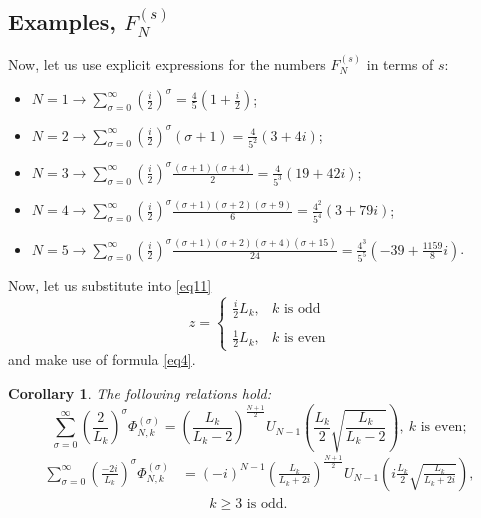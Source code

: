 \documentclass{article}
\newtheorem{cor}[thm]{Corollary}
\begin{document}
\subsection{Examples, $F_N^{(s)}$}

Now, let us use explicit expressions for the numbers $F_N^{(s)}$ in terms of $s$:
\begin{itemize}
\item $N = 1 \rightarrow\sum_{\sigma = 0}^{\infty} \left(\frac{i}{2}\right)^\sigma = \frac{4}{5}\left(1 + \frac{i}{2}\right)$;
\item $N = 2 \rightarrow \sum_{\sigma = 0}^{\infty} \left(\frac{i}{2}\right)^{\sigma}(\sigma + 1) = \frac{4}{5^2}(3 + 4i)$;
\item $N = 3 \rightarrow \sum_{\sigma = 0}^{\infty} \left(\frac{i}{2}\right)^\sigma \frac{(\sigma + 1)(\sigma + 4)}{2} = \frac{4}{5^3}(19 + 42i)$;
\item $N = 4 \rightarrow \sum_{\sigma = 0}^{\infty} \left(\frac{i}{2}\right)^\sigma \frac{(\sigma + 1)(\sigma + 2)(\sigma + 9)}{6} = \frac{4^2}{5^4}(3 + 79i)$;
\item $N = 5 \rightarrow \sum_{\sigma = 0}^{\infty} \left(\frac{i}{2}\right)^\sigma \frac{(\sigma + 1)(\sigma + 2)(\sigma + 4)(\sigma + 15)}{24} = \frac{4^3}{5^5}\left(-39 + \frac{1159}{8}i\right)$.
\end{itemize}

Now, let us substitute into \eqref{eq11}
$$
z = \begin{cases}
\frac{i}{2}L_k, & k \mbox{ is odd} \\ & \\
\frac{1}{2}L_k, & k \mbox{ is even}
\end{cases}
$$
and make use of formula \eqref{eq4}.

\begin{cor}\label{cor2}
The following relations hold:
$$
\sum_{\sigma = 0}^{\infty} \left(\frac{2}{L_k}\right)^\sigma\Phi_{N,k}^{(\sigma)} = \left(\frac{L_k}{L_k - 2}\right)^{\frac{N+1}{2}}U_{N - 1}\left(\frac{L_k}{2}\sqrt{\frac{L_k}{L_k - 2}}\right), \ k \mbox{ is even};
$$
\begin{align*}
\sum_{\sigma = 0}^{\infty} \left(\frac{-2i}{L_k}\right)^\sigma\Phi_{N,k}^{(\sigma)} &= (-i)^{N-1}\left(\frac{L_k}{L_k + 2i}\right)^{\frac{N+1}{2}}U_{N - 1}\left(i\frac{L_k}{2}\sqrt{\frac{L_k}{L_k + 2i}}\right), \\
& \qquad k \geq 3 \mbox{ is odd}.
\end{align*}
\end{cor}
\end{document}
